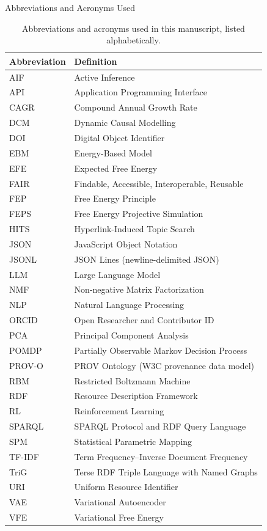 \documentclass[
  ignorenonframetext,
]{beamer}
\begin{document}
\begin{frame}{Abbreviations and Acronyms Used}
\protect{}\label{abbreviations-and-acronyms-used}
\begin{table}[htbp]
\centering
\caption{Abbreviations and acronyms used in this manuscript, listed alphabetically.}
\label{tab:abbreviations}
\begin{tabular}{ll}
\toprule
\textbf{Abbreviation} & \textbf{Definition} \\
\midrule
AIF & Active Inference \\
API & Application Programming Interface \\
CAGR & Compound Annual Growth Rate \\
DCM & Dynamic Causal Modelling \\
DOI & Digital Object Identifier \\
EBM & Energy-Based Model \\
EFE & Expected Free Energy \\
FAIR & Findable, Accessible, Interoperable, Reusable \\
FEP & Free Energy Principle \\
FEPS & Free Energy Projective Simulation \\
HITS & Hyperlink-Induced Topic Search \\
JSON & JavaScript Object Notation \\
JSONL & JSON Lines (newline-delimited JSON) \\
LLM & Large Language Model \\
NMF & Non-negative Matrix Factorization \\
NLP & Natural Language Processing \\
ORCID & Open Researcher and Contributor ID \\
PCA & Principal Component Analysis \\
POMDP & Partially Observable Markov Decision Process \\
PROV-O & PROV Ontology (W3C provenance data model) \\
RBM & Restricted Boltzmann Machine \\
RDF & Resource Description Framework \\
RL & Reinforcement Learning \\
SPARQL & SPARQL Protocol and RDF Query Language \\
SPM & Statistical Parametric Mapping \\
TF-IDF & Term Frequency--Inverse Document Frequency \\
TriG & Terse RDF Triple Language with Named Graphs \\
URI & Uniform Resource Identifier \\
VAE & Variational Autoencoder \\
VFE & Variational Free Energy \\
\bottomrule
\end{tabular}
\end{table}
\end{frame}
\end{document}
